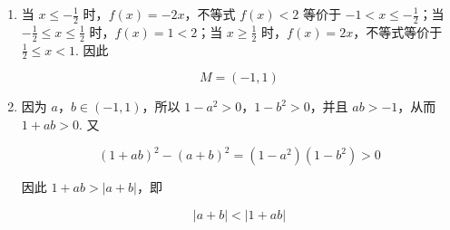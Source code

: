 \begin{solution}
\begin{enumerate}
\item 当 \(x\leq-\frac{1}{2}\) 时，\(f(x)=-2x\)，不等式 \(f(x)<2\) 等价于 \(-1<x\leq-\frac{1}{2}\)；当 \(-\frac{1}{2}\leq x\leq\frac{1}{2}\) 时，\(f(x)=1<2\)；当 \(x\geq\frac{1}{2}\) 时，\(f(x)=2x\)，不等式等价于 \(\frac{1}{2}\leq x<1\). 因此

\[
M=(-1,1)
\]

\item 因为 \(a\)，\(b\in(-1,1)\)，所以 \(1-a^2>0\)，\(1-b^2>0\)，并且 \(ab>-1\)，从而 \(1+ab>0\). 又

\[
\left(1+ab\right)^2-(a+b)^2=(1-a^2)(1-b^2)>0
\]

因此 \(1+ab>|a+b|\)，即

\[
|a+b|<|1+ab|
\]
\end{enumerate}
\end{solution}

